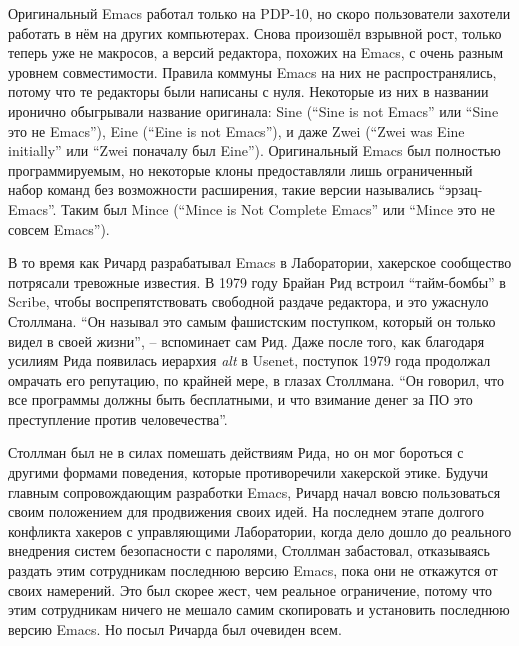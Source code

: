 Оригинальный Emacs работал только на PDP-10, но скоро пользователи захотели работать в нём на других компьютерах. Снова произошёл взрывной рост, только теперь уже не макросов, а версий редактора, похожих на Emacs, с очень разным уровнем совместимости. Правила коммуны Emacs на них не распространялись, потому что те редакторы были написаны с нуля. Некоторые из них в названии иронично обыгрывали название оригинала: Sine (\enquote{Sine is not Emacs} или \enquote{Sine это не Emacs}), Eine (\enquote{Eine is not Emacs}), и даже Zwei (\enquote{Zwei was Eine initially} или \enquote{Zwei поначалу был Eine}). Оригинальный Emacs был полностью программируемым, но некоторые клоны предоставляли лишь ограниченный набор команд без возможности расширения, такие версии назывались \enquote{эрзац-Emacs}. Таким был Mince (\enquote{Mince is Not Complete Emacs} или \enquote{Mince это не совсем Emacs}).

В то время как Ричард разрабатывал Emacs в Лаборатории, хакерское сообщество потрясали тревожные известия. В 1979 году Брайан Рид встроил \enquote{тайм-бомбы} в Scribe, чтобы воспрепятствовать свободной раздаче редактора, и это ужаснуло Столлмана. \enquote{Он называл это самым фашистским поступком, который он только видел в своей жизни}, -- вспоминает сам Рид. Даже после того, как благодаря усилиям Рида появилась иерархия \textit{alt} в Usenet, поступок 1979 года продолжал омрачать его репутацию, по крайней мере, в глазах Столлмана. \enquote{Он говорил, что все программы должны быть бесплатными, и что взимание денег за ПО это преступление против человечества}.

Столлман был не в силах помешать действиям Рида, но он мог бороться с другими формами поведения, которые противоречили хакерской этике. Будучи главным сопровождающим разработки Emacs, Ричард начал вовсю пользоваться своим положением для продвижения своих идей. На последнем этапе долгого конфликта хакеров с управляющими Лаборатории, когда дело дошло до реального внедрения систем безопасности с паролями, Столлман забастовал, отказываясь раздать этим сотрудникам последнюю версию Emacs, пока они не откажутся от своих намерений.  Это был скорее жест, чем реальное ограничение, потому что этим сотрудникам ничего не мешало самим скопировать и установить последнюю версию Emacs. Но посыл Ричарда был очевиден всем.

